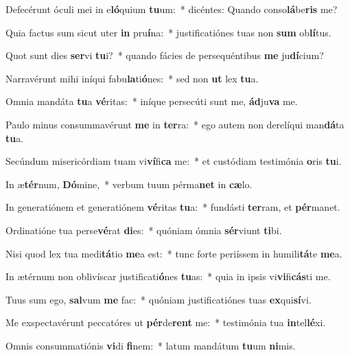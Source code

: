 \item Defecérunt óculi mei in e\textbf{ló}quium \textbf{tu}um:~* dicéntes: Quando conso\textbf{lá}be\textbf{ris} me?
\item Quia factus sum sicut uter \textbf{in} pru\textbf{í}na:~* justificatiónes tuas non \textbf{sum} ob\textbf{lí}tus.
\item Quot sunt dies \textbf{ser}vi \textbf{tu}i?~* quando fácies de persequéntibus \textbf{me} ju\textbf{dí}cium?
\item Narravérunt mihi iníqui fabu\textbf{la}ti\textbf{ó}nes:~* sed non \textbf{ut} lex \textbf{tu}a.
\item Omnia mandáta \textbf{tu}a \textbf{vé}ritas:~* iníque persecúti sunt me, \textbf{ád}ju\textbf{va} me.
\item Paulo minus consummavérunt \textbf{me} in \textbf{ter}ra:~* ego autem non derelíqui man\textbf{dá}ta \textbf{tu}a.
\item Secúndum misericórdiam tuam vi\textbf{ví}fi\textbf{ca} me:~* et custódiam testimónia \textbf{o}ris \textbf{tu}i.
\item In æ\textbf{tér}num, \textbf{Dó}mine,~* verbum tuum pérma\textbf{net} in \textbf{cæ}lo.
\item In generatiónem et generatiónem \textbf{vé}ritas \textbf{tu}a:~* fundásti \textbf{ter}ram, et \textbf{pér}manet.
\item Ordinatióne tua perse\textbf{vé}rat \textbf{di}es:~* quóniam ómnia \textbf{sér}viunt \textbf{ti}bi.
\item Nisi quod lex tua medi\textbf{tá}tio \textbf{me}a est:~* tunc forte periíssem in humili\textbf{tá}te \textbf{me}a.
\item In ætérnum non oblivíscar justificati\textbf{ó}nes \textbf{tu}as:~* quia in ipsis vi\textbf{vi}fi\textbf{cás}ti me.
\item Tuus sum ego, \textbf{sal}vum \textbf{me} fac:~* quóniam justificatiónes tuas \textbf{ex}qui\textbf{sí}vi.
\item Me exspectavérunt peccatóres ut \textbf{pér}de\textbf{rent} me:~* testimónia tua \textbf{in}tel\textbf{lé}xi.
\item Omnis consummatiónis \textbf{vi}di \textbf{fi}nem:~* latum mandátum \textbf{tu}um \textbf{ni}mis.
